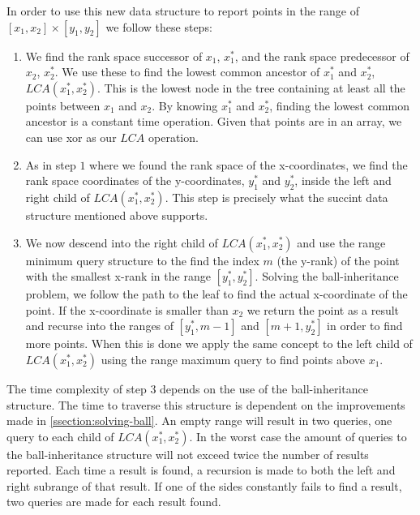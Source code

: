 In order to use this new data structure to report points in the range of $[x_1, x_2] \times [y_1, y_2]$ we follow these steps:
\begin{enumerate}
  \item We find the rank space successor of $x_1$, $x^*_1$, and the rank space predecessor of $x_2$, $x^*_2$. We use these to find the lowest common ancestor of $x^*_1$ and $x^*_2$, $LCA(x^*_1, x^*_2)$. This is the lowest node in the tree containing at least all the points between $x_1$ and $x_2$. By knowing $x^*_1$ and $x^*_2$, finding the lowest common ancestor is a constant time operation. Given that points are in an array, we can use xor as our $LCA$ operation. 
  \item As in step $1$ where we found the rank space of the x-coordinates, we find the rank space coordinates of the y-coordinates, $y^*_1$ and $y^*_2$, inside the left and right child of $LCA(x^*_1, x^*_2)$. This step is precisely what the succint data structure mentioned above supports.
  \item We now descend into the right child of $LCA(x^*_1, x^*_2)$ and use the range minimum query structure to the find the index $m$ (the y-rank) of the point with the smallest x-rank in the range $[y^*_1, y^*_2]$. Solving the ball-inheritance problem, we follow the path to the leaf to find the actual x-coordinate of the point. If the x-coordinate is smaller than $x_2$ we return the point as a result and recurse into the ranges of $[y^*_1, m-1]$ and $[m+1, y^*_2]$ in order to find more points. When this is done we apply the same concept to the left child of $LCA(x^*_1, x^*_2)$ using the range maximum query to find points above $x_1$.
\end{enumerate}


The time complexity of step $3$ depends on the use of the ball-inheritance structure. The time to traverse this structure is dependent on the improvements made in \ref{ssection:solving-ball}. An empty range will result in two queries, one query to each child of $LCA(x^*_1, x^*_2)$. In the worst case the amount of queries to the ball-inheritance structure will not exceed twice the number of results reported. Each time a result is found, a recursion is made to both the left and right subrange of that result. If one of the sides constantly fails to find a result, two queries are made for each result found. 


